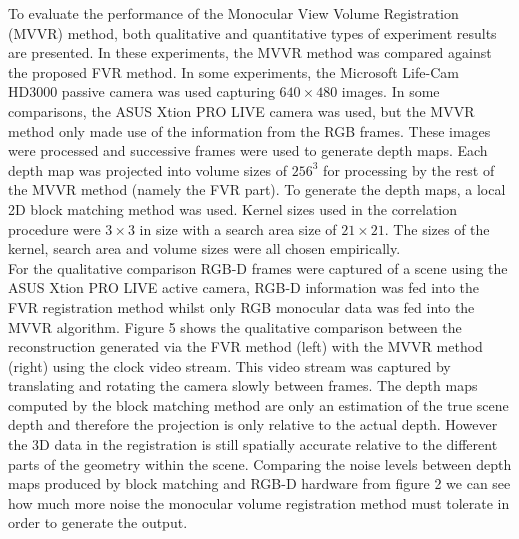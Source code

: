To evaluate the performance of the Monocular View Volume Registration (MVVR) method, both qualitative and quantitative types of experiment results are presented. In these experiments, the MVVR method was compared against the proposed FVR method. In some experiments, the Microsoft Life-Cam HD3000 passive camera was used capturing $640 \times 480$ images. In some comparisons, the ASUS Xtion PRO LIVE camera was used, but the MVVR method only made use of the information from the RGB frames. These images were processed and successive frames were used to generate depth maps. Each depth map was projected into volume sizes of $256^3$ for processing by the rest of the MVVR method (namely the FVR part). To generate the depth maps, a local 2D block matching method was used. Kernel sizes used in the correlation procedure were $3 \times 3$ in size with a search area size of $21 \times 21$. The sizes of the kernel, search area and volume sizes were all chosen empirically. \\


For the qualitative comparison RGB-D frames were captured of a scene using the ASUS Xtion PRO LIVE active camera, RGB-D information was fed into the FVR registration method whilst only RGB monocular data was fed into the MVVR algorithm. Figure 5 shows the qualitative comparison between the reconstruction generated via the FVR method (left) with the MVVR method (right) using the clock video stream. This video stream was captured by translating and rotating the camera slowly between frames. The depth maps computed by the block matching method are only an estimation of the true scene depth and therefore the projection is only relative to the
actual depth. However the 3D data in the registration is still spatially accurate relative to the different parts of the geometry within the scene. Comparing the noise levels between depth maps produced by block matching and RGB-D hardware from figure 2 we can
see how much more noise the monocular volume registration
method must tolerate in order to generate the output. \\


